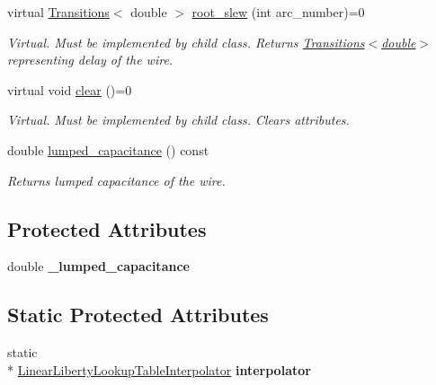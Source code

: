 \begin{DoxyCompactItemize}
virtual \hyperlink{classTransitions}{Transitions}$<$ double $>$ \hyperlink{classWireDelayModel_a9e5344c26b73f549a2b5c38fea8af13d}{root\-\_\-slew} (int arc\-\_\-number)=0
\begin{DoxyCompactList}\small\item\em Virtual. Must be implemented by child class. Returns \hyperlink{classTransitions}{Transitions$<$double$>$} representing delay of the wire. \end{DoxyCompactList}\item 
virtual void \hyperlink{classWireDelayModel_a74869a3a66deb53507e8bc6f16eff45c}{clear} ()=0
\begin{DoxyCompactList}\small\item\em Virtual. Must be implemented by child class. Clears attributes. \end{DoxyCompactList}\item 
double \hyperlink{classWireDelayModel_a05f509843dfa07e17c9b6cc16ba9aaa0}{lumped\-\_\-capacitance} () const 
\begin{DoxyCompactList}\small\item\em Returns lumped capacitance of the wire. \end{DoxyCompactList}\end{DoxyCompactItemize}
\subsection*{Protected Attributes}
\begin{DoxyCompactItemize}
\item 
\hypertarget{classWireDelayModel_ab03b1640710e81c9dcd4cbe9b7fed329}{double {\bfseries \-\_\-lumped\-\_\-capacitance}}\label{classWireDelayModel_ab03b1640710e81c9dcd4cbe9b7fed329}

\end{DoxyCompactItemize}
\subsection*{Static Protected Attributes}
\begin{DoxyCompactItemize}
\item 
\hypertarget{classWireDelayModel_aa8f767316492b902c13ec68651b30247}{static \\*
\hyperlink{classLinearLibertyLookupTableInterpolator}{Linear\-Liberty\-Lookup\-Table\-Interpolator} {\bfseries interpolator}}\label{classWireDelayModel_aa8f767316492b902c13ec68651b30247}

\end{DoxyCompactItemize}


